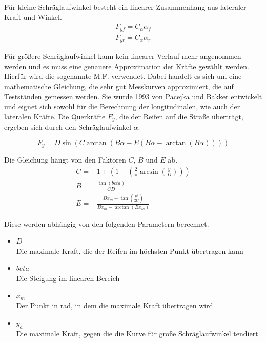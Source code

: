 \documentclass{like}
\begin{document}
Für kleine Schräglaufwinkel besteht ein linearer Zusammenhang aus lateraler Kraft und Winkel.
\begin{eqnarray}
F_{yf} = C_\alpha \alpha_f \\
F_{yr} = C_\alpha \alpha_r
\end{eqnarray}

Für größere Schräglaufwinkel kann kein linearer Verlauf mehr angenommen werden und es muss eine genauere Approximation der Kräfte gewählt werden. Hierfür wird die sogenannte \ac{M.F.}  \cite{magicFormula} verwendet. Dabei handelt es sich um eine mathematische Gleichung, die sehr gut Messkurven approximiert, die auf Testständen gemessen werden.
Sie wurde 1993 von Pacejka und Bakker entwickelt und eignet sich sowohl für die Berechnung der longitudinalen, wie auch der lateralen Kräfte. 
Die Querkräfte $F_y$, die der Reifen auf die Straße überträgt, ergeben sich durch den Schräglaufwinkel $\alpha$.

\begin{equation}
F_y =  D\sin(C\arctan(B\alpha - E(B\alpha - \arctan(B\alpha))))  \label{eq:magicF} 
\end{equation}

Die Gleichung hängt von den Faktoren \(C\), \(B\) und \(E\) ab. 
\begin{eqnarray}
C =& 1 + \left(1- \left(\frac{2}{\pi} \arcsin \left(\frac{y}{D} \right) \right) \right) \\
B =& \frac{\tan(beta)}{CD} \\
E =& \frac{ B  x_m - \tan \left(\frac{pi}{2 C} \right)}{Bx_m - \arctan(Bx_m)}
\end{eqnarray}


Diese werden abhängig von den folgenden Parametern berechnet.

\begin{itemize}
	\item $D$ \\	
	Die maximale Kraft, die der Reifen im höchsten Punkt übertragen kann
	\item $beta$\\
	Die Steigung im linearen Bereich 
	\item $x_m$ \\
	Der Punkt in rad, in dem die maximale Kraft übertragen wird
	\item $y_a$ \\
	Die maximale Kraft, gegen die die Kurve für große Schräglaufwinkel tendiert 
\end{itemize}
\end{document}
